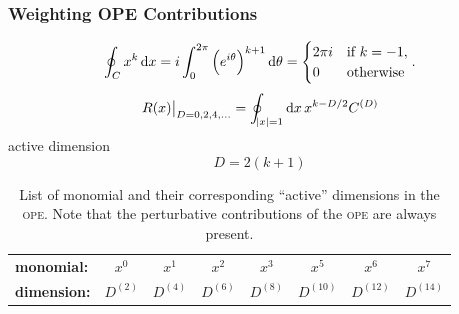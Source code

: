 \documentclass[fleqn]{beamer}
\begin{document}
\begin{frame}
  \frametitle{Weighting OPE Contributions}
  \begin{equation}
    \oint_{C} x^k \dif x = i \int_0^{2\pi}\left(e^{i \theta}\right)^{k+1} \dif \theta
    = \begin{cases} \mbox{\(2 \pi i\)} & \mbox{if } k=-1, \\ \mbox{0} & \mbox{otherwise} \end{cases}.
  \end{equation}
  \begin{equation}
    \left. R(x)\right\vert_{D=0,2,4,\dots} = \oint_{\abs{x}=1} \dif x \, x^{k-D/2} C^{(D)}
  \end{equation}
  active dimension
  \begin{equation}
    D = 2 (k+1)
  \end{equation}
  \begin{table}
    \centering
    \begin{tabular}{l|ccccccc}
      \toprule
      \textbf{monomial:} & \(x^0\) & \(x^1\) & \(x^2\) & \(x^3\) & \(x^5\) & \(x^6\) & \(x^7\)\\
      \textbf{dimension:} & \(D^{(2)}\) & \(D^{(4)}\) & \(D^{(6)}\) & \(D^{(8)}\) & \(D^{(10)}\) & \(D^{(12)}\) & \(D^{(14)}\)\\
      \bottomrule 
    \end{tabular}
    \caption{List of monomial and their corresponding ``active'' dimensions in the
      \textsc{ope}. Note that the perturbative contributions of the \textsc{ope}
      are always present.}
  \end{table}
\end{frame}
\end{document}
